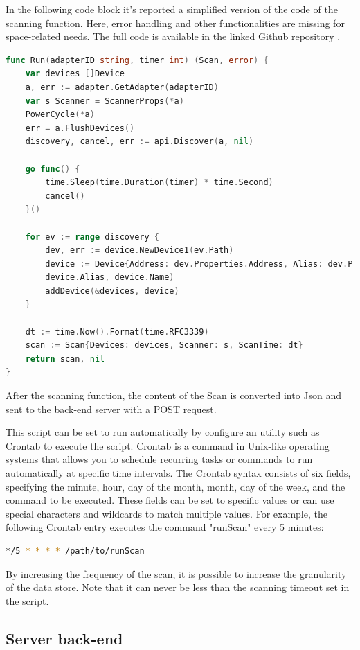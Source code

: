 \documentclass[a4paper, 11pt]{article}
\begin{document}
In the following code block it's reported a simplified version of the code of the scanning function. Here, error handling and other functionalities are missing for space-related needs. The full code is available in the linked Github repository \cite{repo}. 


\begin{lstlisting}[language=Go]
func Run(adapterID string, timer int) (Scan, error) {
	var devices []Device
	a, err := adapter.GetAdapter(adapterID)
	var s Scanner = ScannerProps(*a)
	PowerCycle(*a)
	err = a.FlushDevices()
	discovery, cancel, err := api.Discover(a, nil)

	go func() {
		time.Sleep(time.Duration(timer) * time.Second)
		cancel()
	}()

	for ev := range discovery {
		dev, err := device.NewDevice1(ev.Path)
		device := Device{Address: dev.Properties.Address, Alias: dev.Properties.Alias, Name: dev.Properties.Name, RSSI: dev.Properties.RSSI, TxPower: dev.Properties.TxPower}
		device.Alias, device.Name)
		addDevice(&devices, device)
	}

	dt := time.Now().Format(time.RFC3339)
	scan := Scan{Devices: devices, Scanner: s, ScanTime: dt}
	return scan, nil
}

\end{lstlisting}

After the scanning function, the content of the Scan is converted into Json and sent to the back-end server with a POST request.

This script can be set to run automatically by configure an utility such as Crontab to execute the script. Crontab is a command in Unix-like operating systems that allows you to schedule recurring tasks or commands to run automatically at specific time intervals. The Crontab syntax consists of six fields, specifying the minute, hour, day of the month, month, day of the week, and the command to be executed. These fields can be set to specific values or can use special characters and wildcards to match multiple values. For example, the following Crontab entry executes the command "runScan" every 5 minutes:
\begin{lstlisting}[language=Bash]
*/5 * * * * /path/to/runScan
\end{lstlisting}

By increasing the frequency of the scan, it is possible to increase the granularity of the data store. Note that it can never be less than the scanning timeout set in the script.

\subsection{Server back-end}
\end{document}
